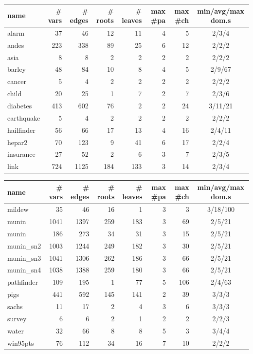 \begin{tabular}{lrrrrrrc}
\toprule
name & \# vars & \# edges & \# roots & \# leaves & max \#pa & max \#ch & min/avg/max dom.s \\
\midrule
alarm & 37 & 46 & 12 & 11 & 4 & 5 & 2/3/4 \\
andes & 223 & 338 & 89 & 25 & 6 & 12 & 2/2/2 \\
asia & 8 & 8 & 2 & 2 & 2 & 2 & 2/2/2 \\
barley & 48 & 84 & 10 & 8 & 4 & 5 & 2/9/67 \\
cancer & 5 & 4 & 2 & 2 & 2 & 2 & 2/2/2 \\
child & 20 & 25 & 1 & 7 & 2 & 7 & 2/3/6 \\
diabetes & 413 & 602 & 76 & 2 & 2 & 24 & 3/11/21 \\
earthquake & 5 & 4 & 2 & 2 & 2 & 2 & 2/2/2 \\
hailfinder & 56 & 66 & 17 & 13 & 4 & 16 & 2/4/11 \\
hepar2 & 70 & 123 & 9 & 41 & 6 & 17 & 2/2/4 \\
insurance & 27 & 52 & 2 & 6 & 3 & 7 & 2/3/5 \\
link & 724 & 1125 & 184 & 133 & 3 & 14 & 2/3/4 \\
\bottomrule
\end{tabular}

\begin{tabular}{lrrrrrrc}
\toprule
name & \# vars & \# edges & \# roots & \# leaves & max \#pa & max \#ch & min/avg/max dom.s \\
\midrule
mildew & 35 & 46 & 16 & 1 & 3 & 3 & 3/18/100 \\
munin & 1041 & 1397 & 259 & 183 & 3 & 69 & 2/5/21 \\
munin & 186 & 273 & 34 & 31 & 3 & 15 & 2/5/21 \\
munin\_sn2 & 1003 & 1244 & 249 & 182 & 3 & 30 & 2/5/21 \\
munin\_sn3 & 1041 & 1306 & 262 & 186 & 3 & 66 & 2/5/21 \\
munin\_sn4 & 1038 & 1388 & 259 & 180 & 3 & 66 & 2/5/21 \\
pathfinder & 109 & 195 & 1 & 77 & 5 & 106 & 2/4/63 \\
pigs & 441 & 592 & 145 & 141 & 2 & 39 & 3/3/3 \\
sachs & 11 & 17 & 2 & 4 & 3 & 6 & 3/3/3 \\
survey & 6 & 6 & 2 & 1 & 2 & 2 & 2/2/3 \\
water & 32 & 66 & 8 & 8 & 5 & 3 & 3/4/4 \\
win95pts & 76 & 112 & 34 & 16 & 7 & 10 & 2/2/2 \\
\bottomrule
\end{tabular}